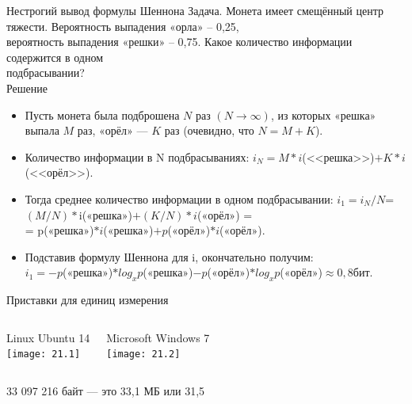 \documentclass[9pt,aspectratio=169]{beamer}
\begin{document}
	\begin{frame}{Нестрогий вывод формулы Шеннона}
	        \vspace*{-10mm}
	        \color[rgb]{0.2,0.7,0.4}
			\noindent Задача.
			\color{black}
	        Монета имеет смещённый центр тяжести. Вероятность выпадения «орла» – 0,25,\\
            вероятность выпадения «решки» – 0,75. Какое количество информации содержится в одном\\
            подбрасывании?\\
            
            \color[rgb]{0.2,0.7,0.4}
			\noindent Решение
			\color{black}
	        \begin{itemize}
	            \item[\textbullet] Пусть монета была подброшена $N$ раз $(N\to \infty)$, из которых «решка» выпала $M$ раз, «орёл» —
$K$ раз (очевидно, что $N = M + K$). 
                \item[\textbullet] Количество информации в N подбрасываниях: $i_N = M*i$(<<решка>>)$ + K*i$(<<орёл>>).
                \item[\textbullet] Тогда среднее количество информации в одном подбрасывании: $i_1=i_N/N$=$(M/N)*$i(«решка»)$+(K/N)*i$(«орёл») =\\ = \noindent p(«решка»)$*i$(«решка»)$+p$(«орёл»)$*i$(«орёл»).
                \item[\textbullet] Подставив формулу Шеннона для i, окончательно получим:\\
                $i_1=-p$(«решка»)$*log_x
p$(«решка»)$ - p$(«орёл»)$*log_x
p$(«орёл»)$ \approx 0,8 бит.$

	        \end{itemize}
	\end{frame}
	\begin{frame}{Приставки для единиц измерения}
	        \vspace*{-15mm}
	        \begin{columns}[2]
	            \begin{center}
	                Linux Ubuntu 14\\
	                \texttt{[image: 21.1]}
                \end{center}
                \begin{center}
                    Microsoft Windows 7\\
                    \texttt{[image: 21.2]}
                \end{center}
	        \end{columns}
    	        \begin{center} 33 097 216 байт — это \color[rgb]{0.2,0.7,0.4} 33,1 
    			\color{black} МБ или \color[rgb]{0.2,0.7,0.4} 31,5 
    			\color{black}
			\end{center}
	\end{frame}
\end{document}
